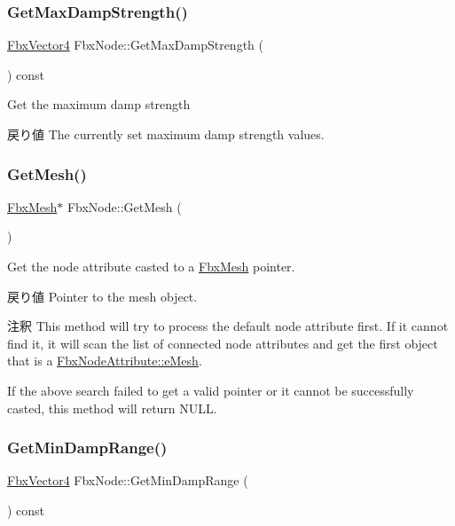 \subsubsection{\texorpdfstring{Get\+Max\+Damp\+Strength()}{GetMaxDampStrength()}}
{\footnotesize\ttfamily \hyperlink{class_fbx_vector4}{Fbx\+Vector4} Fbx\+Node\+::\+Get\+Max\+Damp\+Strength (\begin{DoxyParamCaption}{ }\end{DoxyParamCaption}) const}

Get the maximum damp strength \begin{DoxyReturn}{戻り値}
The currently set maximum damp strength values. 
\end{DoxyReturn}
\mbox{\label{class_fbx_node_a7e9e1ea8c34e823782cb778e197a03e0}} 
\subsubsection{\texorpdfstring{Get\+Mesh()}{GetMesh()}}
{\footnotesize\ttfamily \hyperlink{class_fbx_mesh}{Fbx\+Mesh}$\ast$ Fbx\+Node\+::\+Get\+Mesh (\begin{DoxyParamCaption}{ }\end{DoxyParamCaption})}

Get the node attribute casted to a \hyperlink{class_fbx_mesh}{Fbx\+Mesh} pointer. \begin{DoxyReturn}{戻り値}
Pointer to the mesh object. 
\end{DoxyReturn}
\begin{DoxyRemark}{注釈}
This method will try to process the default node attribute first. If it cannot find it, it will scan the list of connected node attributes and get the first object that is a \hyperlink{class_fbx_node_attribute_a08e1669d3d1a696910756ab17de56d6aa1f3752eb765c9e29065decc930b75fb8}{Fbx\+Node\+Attribute\+::e\+Mesh}. 

If the above search failed to get a valid pointer or it cannot be successfully casted, this method will return {\ttfamily N\+U\+LL}. 
\end{DoxyRemark}
\mbox{\label{class_fbx_node_a98ef65828cb2e5e6ae17ba3a61ed09b2}} 
\subsubsection{\texorpdfstring{Get\+Min\+Damp\+Range()}{GetMinDampRange()}}
{\footnotesize\ttfamily \hyperlink{class_fbx_vector4}{Fbx\+Vector4} Fbx\+Node\+::\+Get\+Min\+Damp\+Range (\begin{DoxyParamCaption}{ }\end{DoxyParamCaption}) const}

